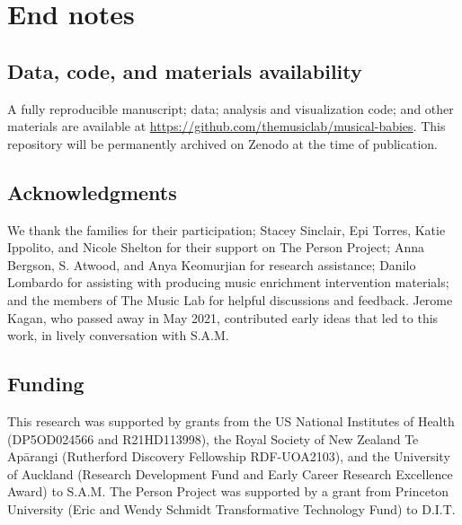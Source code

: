 \documentclass[
]{article}
\begin{document}
\clearpage

\section*{End notes}\label{end-notes}

\subsection*{Data, code, and materials
availability}\label{data-code-and-materials-availability}

A fully reproducible manuscript; data; analysis and visualization code;
and other materials are available at
\url{https://github.com/themusiclab/musical-babies}. This repository
will be permanently archived on Zenodo at the time of publication.

\subsection*{Acknowledgments}\label{acknowledgments}

We thank the families for their participation; Stacey Sinclair, Epi
Torres, Katie Ippolito, and Nicole Shelton for their support on The
Person Project; Anna Bergson, S. Atwood, and Anya Keomurjian for
research assistance; Danilo Lombardo for assisting with producing music
enrichment intervention materials; and the members of The Music Lab for
helpful discussions and feedback. Jerome Kagan, who passed away in May
2021, contributed early ideas that led to this work, in lively
conversation with S.A.M.

\subsection*{Funding}\label{funding}

This research was supported by grants from the US National Institutes of
Health (DP5OD024566 and R21HD113998), the Royal Society of New Zealand
Te Apārangi (Rutherford Discovery Fellowship RDF-UOA2103), and the
University of Auckland (Research Development Fund and Early Career
Research Excellence Award) to S.A.M. The Person Project was supported by
a grant from Princeton University (Eric and Wendy Schmidt Transformative
Technology Fund) to D.I.T.
\end{document}
